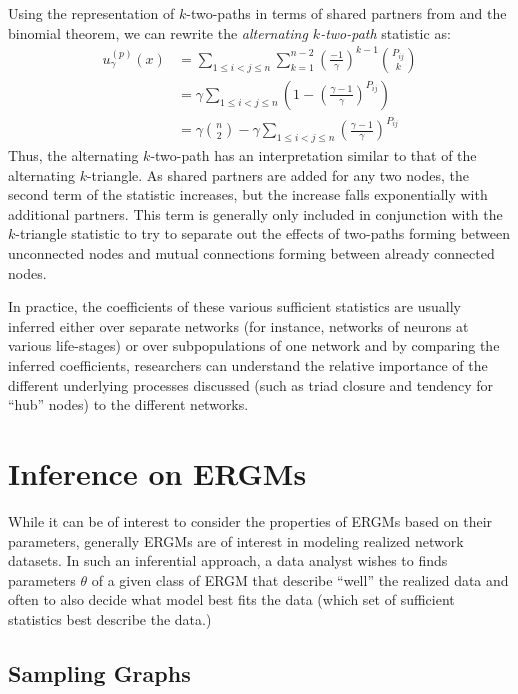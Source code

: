 Using the representation of $k$-two-paths in terms of shared partners from  and the binomial theorem, we can rewrite the \emph{alternating $k$-two-path} statistic as: 
\begin{align}
\label{eq:alternative-k-two-path}
u_\gamma^{(p)}(x) & = \sum_{1 \leq i < j \leq n} \sum_{k = 1}^{n-2} \left(\frac{-1}{\gamma}\right)^{k-1}  \binom{P_{ij}}{k} \nonumber\\
& = \gamma \sum_{1 \leq i < j \leq n}\left(1 - \left(\frac{\gamma-1}{\gamma} \right)^{P_{ij}} \right) \nonumber\\
& = \gamma \binom{n}{2} - \gamma \sum_{1 \leq i < j \leq n} \left(\frac{\gamma-1}{\gamma} \right)^{P_{ij}}
\end{align}
Thus, the alternating $k$-two-path has an interpretation similar to that of the alternating $k$-triangle. As shared partners are added for any two nodes, the second term of the statistic increases, but the increase falls exponentially with additional partners. This term is generally only included in conjunction with the $k$-triangle statistic to try to separate out the effects of two-paths forming between unconnected nodes and mutual connections forming between already connected nodes.

In practice, the coefficients of these various sufficient statistics are usually inferred either over separate networks (for instance, networks of neurons at various life-stages) or over subpopulations of one network and by comparing the inferred coefficients, researchers can understand the relative importance of the different underlying processes discussed (such as triad closure and tendency for ``hub'' nodes) to the different networks.

\section{Inference on ERGMs}

While it can be of interest to consider the properties of ERGMs based on their parameters, generally ERGMs are of interest in modeling realized network datasets. In such an inferential approach, a data analyst wishes to finds parameters $\theta$ of a given class of ERGM that describe ``well'' the realized data and often to also decide what model best fits the data (which set of sufficient statistics best describe the data.)

\subsection{Sampling Graphs}

